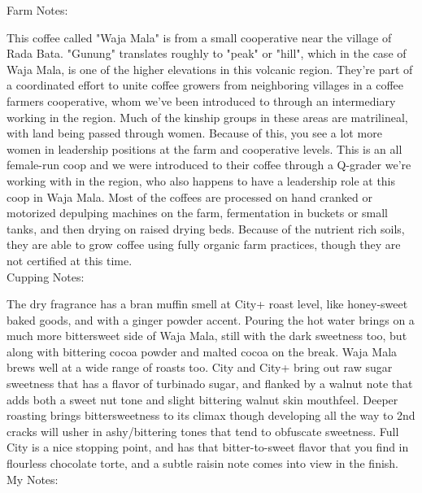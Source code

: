 \documentclass[10pt,twoside,footinclude=true,headinclude=true]{scrbook} %
\newlength{\mysize}
\newcommand{\myfontsize}[1]{
  \setlength{\mysize}{#1pt}
  \fontsize{\mysize}{1.2\mysize}
  \selectfont
}
\begin{document}

\newpage
\vspace*{-2.2em}
\raggedright
\normalsize
Farm Notes: \\
\myfontsize{8}
This coffee called "Waja Mala" is from a small cooperative near the village of Rada Bata. "Gunung" translates roughly to "peak" or "hill", which in the case of Waja Mala, is one of the higher elevations in this volcanic region. They're part of a coordinated effort to unite coffee growers from neighboring villages in a coffee farmers cooperative, whom we've been introduced to through an intermediary working in the region. Much of the kinship groups in these areas are matrilineal, with land being passed through women. Because of this, you see a lot more women in leadership positions at the farm and cooperative levels. This is an all female-run coop and we were introduced to their coffee through a Q-grader we're working with in the region, who also happens to have a leadership role at this coop in Waja Mala. Most of the coffees are processed on hand cranked or motorized depulping machines on the farm, fermentation in buckets or small tanks, and then drying on raised drying beds. Because of the nutrient rich soils, they are able to grow coffee using fully organic farm practices, though they are not certified at this time. \\
\medskip
\normalsize
Cupping Notes: \\
\myfontsize{8}
The dry fragrance has a bran muffin smell at City+ roast level, like honey-sweet baked goods, and with a ginger powder accent. Pouring the hot water brings on a much more bittersweet side of Waja Mala, still with the dark sweetness too, but along with bittering cocoa powder and malted cocoa on the break. Waja Mala brews well at a wide range of roasts too. City and City+ bring out raw sugar sweetness that has a flavor of turbinado sugar, and flanked by a walnut note that adds both a sweet nut tone and slight bittering walnut skin mouthfeel. Deeper roasting brings bittersweetness to its climax though developing all the way to 2nd cracks will usher in ashy/bittering tones that tend to obfuscate sweetness. Full City is a nice stopping point, and has that bitter-to-sweet flavor that you find in flourless chocolate torte, and a subtle raisin note comes into view in the finish. \\
\medskip
\normalsize
My Notes:
\end{document}
